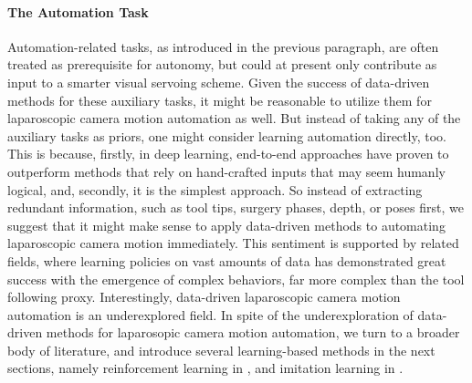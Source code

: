 \paragraph{The Automation Task} Automation-related tasks, as introduced in the previous paragraph, are often treated as prerequisite for autonomy, but could at present only contribute as input to a smarter visual servoing scheme. Given the success of data-driven methods for these auxiliary tasks, it might be reasonable to utilize them for laparoscopic camera motion automation as well. But instead of taking any of the auxiliary tasks as priors, one might consider learning automation directly, too. This is because, firstly, in deep learning, end-to-end approaches have proven to outperform methods that rely on hand-crafted inputs that may seem humanly logical, and, secondly, it is the simplest approach. So instead of extracting redundant information, such as tool tips, surgery phases, depth, or poses first, we suggest that it might make sense to apply data-driven methods to automating laparoscopic camera motion immediately. This sentiment is supported by related fields, where learning policies on vast amounts of data has demonstrated great success with the emergence of complex behaviors, far more complex than the tool following proxy. Interestingly, data-driven laparoscopic camera motion automation is an underexplored field. In spite of the underexploration of data-driven methods for laparosopic camera motion automation, we turn to a broader body of literature, and introduce several learning-based methods in the next sections, namely reinforcement learning in , and imitation learning in .






